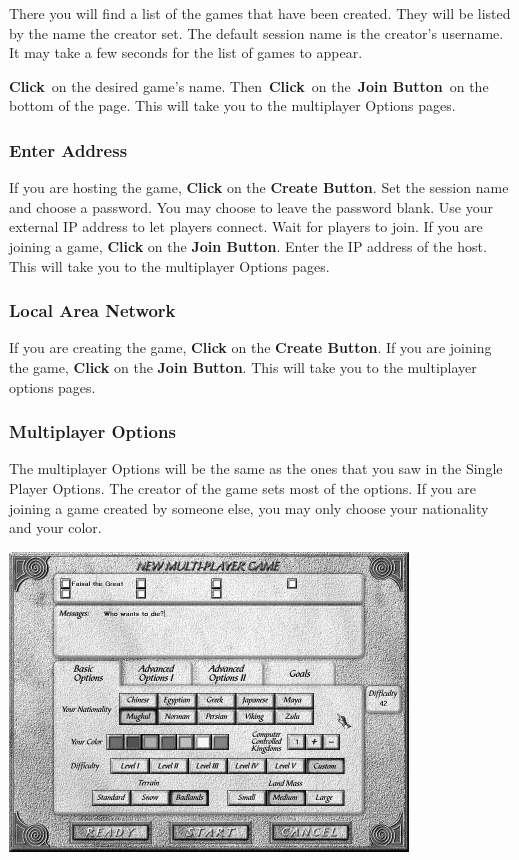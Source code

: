 There you will find a list of the games that have been created. They will be listed by the name the creator set. The default session name is the creator’s username. It may take a few seconds for the list of games to appear.

\textbf{Click} on the desired game’s name. Then \textbf{Click} on the \textbf{Join Button} on the bottom of the page. This will take you to the multiplayer Options pages.

\subsubsection{Enter Address}

If you are hosting the game, \textbf{Click} on the \textbf{Create Button}. Set the session name and choose a password. You may choose to leave the password blank. Use your external IP address to let players connect. Wait for players to join. If you are joining a game, \textbf{Click} on the \textbf{Join Button}. Enter the IP address of the host. This will take you to the multiplayer Options pages.

\subsubsection{Local Area Network}

If you are creating the game, \textbf{Click} on the \textbf{Create Button}. If you are joining the game, \textbf{Click} on the \textbf{Join Button}. This will take you to the multiplayer options pages.

\subsubsection{Multiplayer Options}

The multiplayer Options will be the same as the ones that you saw in the Single Player Options. The creator of the game sets most of the options. If you are joining a game created by someone else, you may only choose your nationality and your color.

\begin{center}
	\includegraphics[width=0.7\linewidth]{Imultiplayer3}
\end{center}

